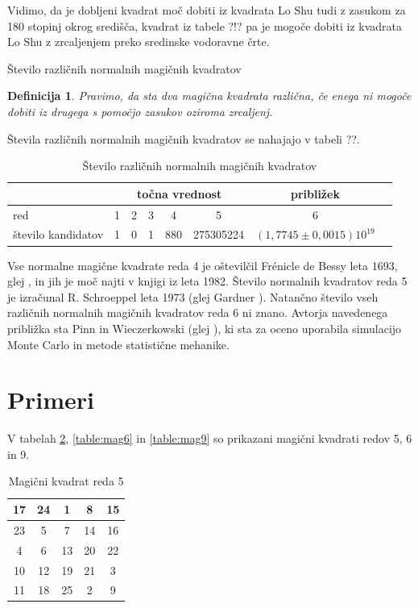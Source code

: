 \documentclass[a4paper,12pt]{article}
\newtheorem{definicija}[izrek]{Definicija}
\begin{document}
Vidimo, da je dobljeni kvadrat moč dobiti iz kvadrata Lo Shu tudi z zasukom za
180 stopinj okrog središča, kvadrat iz tabele ?!? pa je mogoče dobiti
iz kvadrata Lo Shu z zrcaljenjem preko sredinske vodoravne črte.

Število različnih normalnih magičnih kvadratov

\begin{definicija}
      Pravimo, da sta dva magična kvadrata \emph{različna}, če enega ni mogoče dobiti
      iz drugega s pomočjo zasukov oziroma zrcaljenj.
\end{definicija}

Števila različnih normalnih magičnih kvadratov se nahajajo v tabeli ??.


\begin{table}[ht!]
   \centering
   \caption{Število različnih normalnih magičnih kvadratov}
   \begin{tabular}{lccccccc}
   \toprule
   & \multicolumn{5}{c}{točna vrednost} & približek\\ \midrule
   red & 1 & 2 & 3 & 4 & 5 & 6 \\
   število kandidatov& 1 & 0 & 1 & 880 & 275305224 & $(1,7745\pm0,0015)10^{19}$ \\
   \bottomrule
   \end{tabular}
   \label{stevila}
\end{table}



Vse normalne magične kvadrate reda 4 je oštevilčil Frénicle de Bessy
leta 1693, glej \cite{bessy}, in jih je moč najti v knjigi \cite{berlekamp}
iz leta 1982. Število normalnih kvadratov reda 5 je izračunal
R. Schroeppel leta 1973 (glej Gardner \cite{gardner}).
Natančno število vseh različnih normalnih magičnih kvadratov reda 6 ni znano.
Avtorja navedenega približka sta Pinn in Wieczerkowski (glej \cite{pinn}), ki
sta za oceno uporabila simulacijo Monte Carlo in metode statistične mehanike.



\section{Primeri}

V tabelah \ref{table:mag5}, \ref{table:mag6} in \ref{table:mag9} so prikazani
magični kvadrati redov 5, 6 in 9.


\begin{table}[h!]
   \large
   \centering
   \caption{Magični kvadrat reda 5}
   \begin{tabular}{|c|c|c|c|c|}
      \hline
      17 & 24 &  1 &  8 & 15 \\\hline
      23 &  5 &  7 & 14 & 16 \\\hline
      4 &  6 & 13 & 20 & 22 \\\hline
      10 & 12 & 19 & 21 &  3 \\\hline
      11 & 18 & 25 &  2 &  9 \\\hline
   \end{tabular}
   \label{table:mag5}
\end{table}
\end{document}
